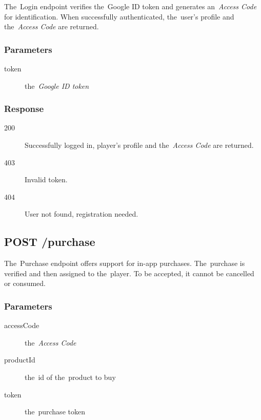 The~Login endpoint verifies the~Google ID token and generates an~\textit{Access Code} for identification. When successfully authenticated, the~user's profile and the~\textit{Access Code} are returned.

\subsubsection*{Parameters}

\begin{description}

	\item[token] the~\textit{Google ID token}

\end{description}

\subsubsection*{Response}

\begin{description}

	\item[200] Successfully logged in, player's profile and the~\textit{Access Code} are returned.

	\item[403] Invalid token.

	\item[404] User not found, registration needed.

\end{description}

\subsection{POST /purchase}

The~Purchase endpoint offers support for in-app purchases. The~purchase is verified and then assigned to the~player. To be accepted, it cannot be cancelled or consumed.

\subsubsection*{Parameters}

\begin{description}

	\item[accessCode] the~\textit{Access Code}

	\item[productId] the~id of the~product to buy

	\item[token] the~purchase token

\end{description}

